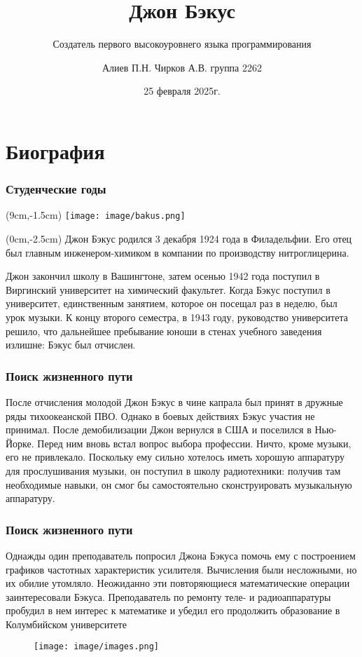 \documentclass{beamer}
\author[Алиев П.Н. Чирков А.В.]{Алиев П.Н. Чирков А.В. группа 2262}
\title{Джон Бэкус}
\subtitle{Создатель первого высокоуровнего языка программирования}
\date[2025г.]{25 февраля 2025г.}
\begin{document}

\begin{frame}
\titlepage
\end{frame}

\section{Биография}
\begin{frame}
	\frametitle{Студенческие годы}
	\begin{textblock*}{3cm}(9cm,-1.5cm)
	\texttt{[image: image/bakus.png]}
	\end{textblock*}
	\begin{textblock*}{9cm}(0cm,-2.5cm)
	Джон Бэкус родился 3 декабря 1924 года в Филадельфии. Его отец был главным инженером-химиком в компании по производству нитроглицерина. 

	Джон закончил школу в Вашингтоне, затем осенью 1942 года поступил в Виргинский университет на химический факультет. Когда Бэкус поступил в 			университет, единственным занятием, которое он посещал раз в неделю, был урок музыки. К концу второго семестра, в 1943 году, руководство университета решило, что дальнейшее пребывание юноши в стенах учебного заведения излишне: Бэкус был отчислен.
	\end{textblock*}
\end{frame}

\begin{frame}
\frametitle{Поиск жизненного пути}
После отчисления молодой Джон Бэкус в чине капрала был принят в дружные ряды тихоокеанской ПВО. Однако в боевых действиях Бэкус участия не принимал.
После демобилизации Джон вернулся в США и поселился в Нью-Йорке. Перед ним вновь встал вопрос выбора профессии. Ничто, кроме музыки, его не привлекало. Поскольку ему сильно хотелось иметь хорошую аппаратуру для прослушивания музыки, он поступил в школу радиотехники: получив там необходимые навыки, он смог бы самостоятельно сконструировать музыкальную аппаратуру.
\end{frame}

\begin{frame}
\frametitle{Поиск жизненного пути}
Однажды один преподаватель попросил Джона Бэкуса помочь ему с построением графиков частотных характеристик усилителя. Вычисления были несложными, но их обилие утомляло. Неожиданно эти повторяющиеся математические операции заинтересовали Бэкуса. Преподаватель по ремонту теле- и радиоаппаратуры пробудил в нем интерес к математике и убедил его продолжить образование в Колумбийском университете

\begin{figure}
\texttt{[image: image/images.png]}
\end{figure}
\end{frame}
\end{document}
